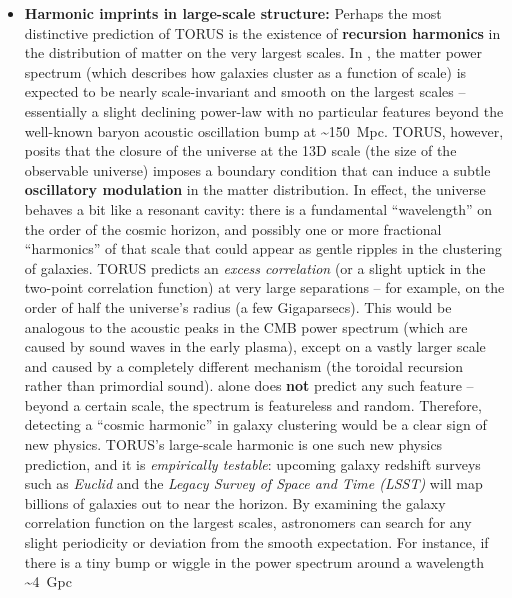 \documentclass[
]{article}
\begin{document}
\begin{itemize}
\item
  \textbf{Harmonic imprints in large-scale structure:} Perhaps the most
  distinctive prediction of TORUS is the existence of \textbf{recursion
  harmonics} in the distribution of matter on the very largest scales.
  In \LambdaCDM, the matter power spectrum (which describes how galaxies
  cluster as a function of scale) is expected to be nearly
  scale-invariant and smooth on the largest scales -- essentially a
  slight declining power-law with no particular features beyond the
  well-known baryon acoustic oscillation bump at \textasciitilde150~Mpc.
  TORUS, however, posits that the closure of the universe at the 13D
  scale (the size of the observable universe) imposes a boundary
  condition that can induce a subtle \textbf{oscillatory modulation} in
  the matter distribution\hspace{0pt}. In effect, the universe behaves a
  bit like a resonant cavity: there is a fundamental ``wavelength'' on
  the order of the cosmic horizon, and possibly one or more fractional
  ``harmonics'' of that scale that could appear as gentle ripples in the
  clustering of galaxies. TORUS predicts an \emph{excess correlation}
  (or a slight uptick in the two-point correlation function) at very
  large separations -- for example, on the order of half the universe's
  radius (a few Gigaparsecs)\hspace{0pt}. This would be analogous to the
  acoustic peaks in the CMB power spectrum (which are caused by sound
  waves in the early plasma), except on a vastly larger scale and caused
  by a completely different mechanism (the toroidal recursion rather
  than primordial sound). \LambdaCDM alone does \textbf{not} predict any such
  feature -- beyond a certain scale, the \LambdaCDM spectrum is featureless
  and random. Therefore, detecting a ``cosmic harmonic'' in galaxy
  clustering would be a clear sign of new physics. TORUS's large-scale
  harmonic is one such new physics prediction, and it is
  \emph{empirically testable}: upcoming galaxy redshift surveys such as
  \emph{Euclid} and the \emph{Legacy Survey of Space and Time (LSST)}
  will map billions of galaxies out to near the horizon. By examining
  the galaxy correlation function on the largest scales, astronomers can
  search for any slight periodicity or deviation from the smooth \LambdaCDM
  expectation\hspace{0pt}. For instance, if there is a tiny bump or
  wiggle in the power spectrum around a wavelength \textasciitilde4~Gpc

\end{itemize}
\end{document}
